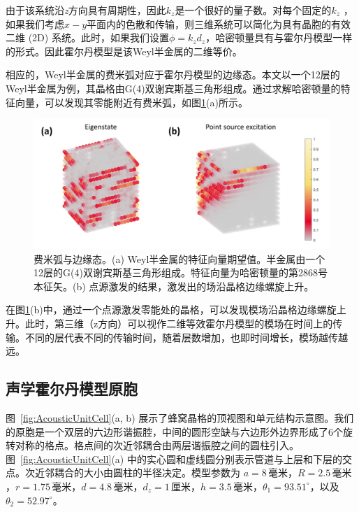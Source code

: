 由于该系统沿\textit{z}方向具有周期性，因此$k_z$是一个很好的量子数。对每个固定的$k_z$ ，如果我们考虑$x-y$平面内的色散和传输，则三维系统可以简化为具有晶胞的有效二维 (2D) 系统。此时，如果我们设置$\phi=k_zd_z$，哈密顿量具有与霍尔丹模型一样的形式。因此霍尔丹模型是该Weyl半金属的二维等价。

相应的，Weyl半金属的费米弧对应于霍尔丹模型的边缘态。本文以一个12层的Weyl半金属为例，其晶格由G(4)双谢宾斯基三角形组成。通过求解哈密顿量的特征向量，可以发现其零能附近有费米弧，如图\ref{fig:3DFermiArc}(a)所示。

\begin{figure}[htbp]
    \centering
    \includegraphics[width=0.75\linewidth]{figure/FracHaldExp/3DFermiArc.png}
    \caption{费米弧与边缘态。(a) Weyl半金属的特征向量期望值。半金属由一个12层的G(4)双谢宾斯基三角形组成。特征向量为哈密顿量的第2868号本征矢。(b) 点源激发的结果，激发出的场沿晶格边缘螺旋上升。}
    \label{fig:3DFermiArc}
\end{figure}

在图\ref{fig:3DFermiArc}(b)中，通过一个点源激发零能处的晶格，可以发现模场沿晶格边缘螺旋上升。此时，第三维（z方向）可以视作二维等效霍尔丹模型的模场在时间上的传输。不同的层代表不同的传输时间，随着层数增加，也即时间增长，模场越传越远。
\subsection{声学霍尔丹模型原胞}
图~\ref{fig:AcousticUnitCell}(a, b) 展示了蜂窝晶格的顶视图和单元结构示意图。我们的原胞是一个双层的六边形谐振腔，中间的圆形空缺与六边形外边界形成了6个旋转对称的格点。格点间的次近邻耦合由两层谐振腔之间的圆柱引入。图~\ref{fig:AcousticUnitCell}(a) 中的实心圆和虚线圆分别表示管道与上层和下层的交点。次近邻耦合的大小由圆柱的半径决定。模型参数为 $a = 8\,\text{毫米}$，$R = 2.5\,\text{毫米}$，$r = 1.75\,\text{毫米}$，$d = 4.8\,\text{毫米}$，$d_z = 1\,\text{厘米}$，$h = 3.5\,\text{毫米}$，$\theta_1 = 93.51^\circ$，以及 $\theta_2 = 52.97^\circ$。

